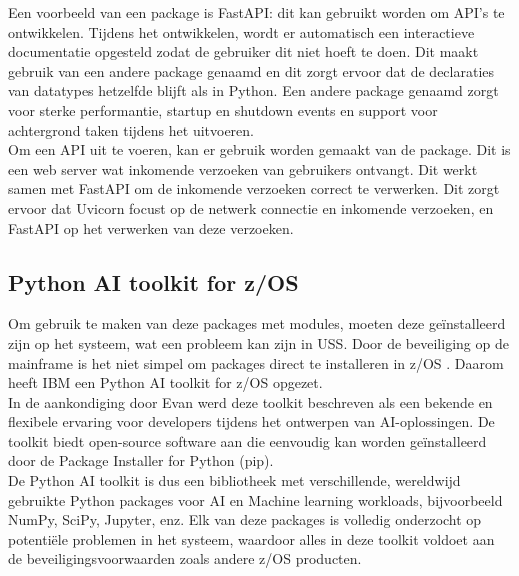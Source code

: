 Een voorbeeld van een package is FastAPI: dit kan gebruikt worden om API's te ontwikkelen. Tijdens het ontwikkelen, wordt er automatisch een interactieve documentatie opgesteld zodat de gebruiker dit niet hoeft te doen. Dit maakt gebruik van een andere package genaamd  en dit zorgt ervoor dat de declaraties van datatypes hetzelfde blijft als in Python. Een andere package genaamd  zorgt voor sterke performantie, startup en shutdown events en support voor achtergrond taken tijdens het uitvoeren. \autocite{FastAPI} \\

Om een API uit te voeren, kan er gebruik worden gemaakt van de  package. Dit is een web server wat inkomende verzoeken van gebruikers ontvangt. Dit werkt samen met FastAPI om de inkomende verzoeken correct te verwerken. Dit zorgt ervoor dat Uvicorn focust op de netwerk connectie en inkomende verzoeken, en FastAPI op het verwerken van deze verzoeken. \autocite{Sentry2024}

\subsection{Python AI toolkit for z/OS}
Om gebruik te maken van deze packages met modules, moeten deze geïnstalleerd zijn op het systeem, wat een probleem kan zijn in USS. Door de beveiliging op de mainframe is het niet simpel om packages direct te installeren in z/OS \autocite{IBM2021}. Daarom heeft IBM een Python AI toolkit for z/OS opgezet. \\

In de aankondiging door Evan \textcite{Rivera2023} werd deze toolkit beschreven als een bekende en flexibele ervaring voor developers tijdens het ontwerpen van AI-oplossingen. De toolkit biedt open-source software aan die eenvoudig kan worden geïnstalleerd door de Package Installer for Python (pip). \\

De Python AI toolkit is dus een bibliotheek met verschillende, wereldwijd gebruikte Python packages voor AI en Machine learning workloads, bijvoorbeeld NumPy, SciPy, Jupyter, enz. Elk van deze packages is volledig onderzocht op potentiële problemen in het systeem, waardoor alles in deze toolkit voldoet aan de beveiligingsvoorwaarden zoals andere z/OS producten. \autocite{Bostian2023}

